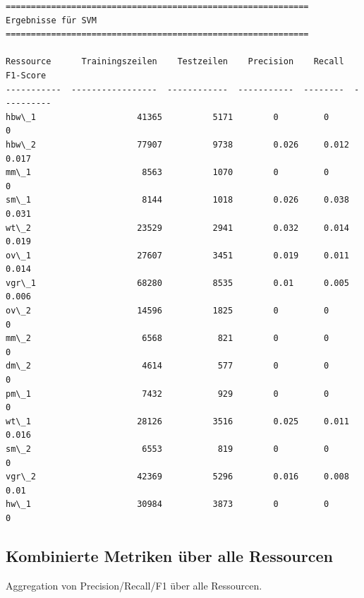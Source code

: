 \documentclass[11pt]{article}
\begin{document}
\begin{Verbatim}[commandchars=\\\{\}]
============================================================
Ergebnisse für SVM
============================================================

Ressource      Trainingszeilen    Testzeilen    Precision    Recall    F1-Score
-----------  -----------------  ------------  -----------  --------  ----------
hbw\_1                    41365          5171        0         0           0
hbw\_2                    77907          9738        0.026     0.012       0.017
mm\_1                      8563          1070        0         0           0
sm\_1                      8144          1018        0.026     0.038       0.031
wt\_2                     23529          2941        0.032     0.014       0.019
ov\_1                     27607          3451        0.019     0.011       0.014
vgr\_1                    68280          8535        0.01      0.005       0.006
ov\_2                     14596          1825        0         0           0
mm\_2                      6568           821        0         0           0
dm\_2                      4614           577        0         0           0
pm\_1                      7432           929        0         0           0
wt\_1                     28126          3516        0.025     0.011       0.016
sm\_2                      6553           819        0         0           0
vgr\_2                    42369          5296        0.016     0.008       0.01
hw\_1                     30984          3873        0         0           0
    \end{Verbatim}

    \subsection{Kombinierte Metriken über alle
Ressourcen}\label{kombinierte-metriken-uxfcber-alle-ressourcen}

Aggregation von Precision/Recall/F1 über alle Ressourcen.
\end{document}
